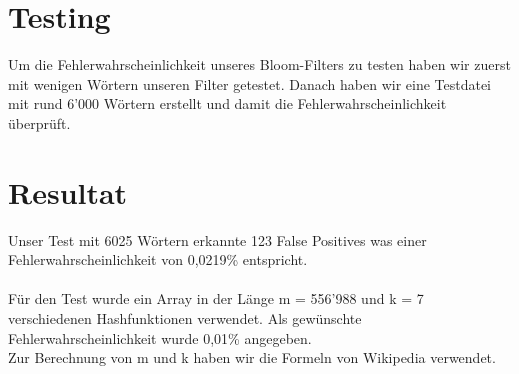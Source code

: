 \documentclass{article}
\begin{document}
\section{Testing}
Um die Fehlerwahrscheinlichkeit unseres Bloom-Filters zu testen haben wir zuerst mit wenigen Wörtern unseren Filter getestet. Danach haben wir eine Testdatei mit rund 6'000 Wörtern erstellt und damit die Fehlerwahrscheinlichkeit überprüft.

\section{Resultat}
Unser Test mit 6025 Wörtern erkannte 123 False Positives was einer Fehlerwahrscheinlichkeit von 0,0219\% entspricht.
\\
\\
Für den Test wurde ein Array in der Länge {m} = 556'988 und {k} = 7 verschiedenen Hashfunktionen verwendet. Als gewünschte Fehlerwahrscheinlichkeit wurde 0,01\% angegeben.
\\
Zur Berechnung von {m} und {k} haben wir die Formeln von Wikipedia verwendet.\citep{wikipediaNumberOfHash}

\pagebreak



\end{document}
